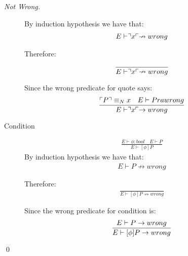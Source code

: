 \begin{proof}[Not Wrong]
\begin{description}
		By induction hypothesis we have that:
		\begin{align*}
		E \vdash \urcorner x \ulcorner \nrightarrow wrong
		\end{align*}
		
		Therefore:
		\begin{align*}
		\frac{}{E \vdash \urcorner x \ulcorner \nrightarrow wrong}
		\end{align*}
		
		Since the wrong predicate for quote says:
		\begin{align*}
		\frac{\ulcorner P \urcorner \equiv _N x \quad E \vdash P ra wrong}{E \vdash \urcorner x \ulcorner \rightarrow wrong}
		\end{align*}
	\item[Condition]
		\begin{align*}
		\frac{E \vdash \phi : bool \quad E \vdash P}{E \vdash [\phi]P}
		\end{align*}
		By induction hypothesis we have that:
		\begin{align*}
		E \vdash P \nrightarrow wrong
		\end{align*}
		
		Therefore:
		\begin{align*}
		\frac{}{E \vdash [\phi ]P \nrightarrow wrong}
		\end{align*}
		
		Since the wrong predicate for condition is:
		\begin{align*}
		\frac{E \vdash P \rightarrow wrong}{E \vdash [\phi ]P \rightarrow wrong}
		\end{align*}
	\end{description}
	\qed
\end{proof}
